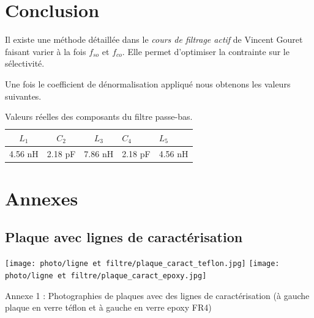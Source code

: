 \documentclass[french]{article}
\begin{document}
\section{Conclusion}
Il existe une méthode détaillée dans le \textit{cours de filtrage actif} de Vincent Gouret faisant varier à la fois $f_{so}$ et $f_{co}$. Elle permet d'optimiser la contrainte sur le sélectivité. 












Une fois le coefficient de dénormalisation appliqué nous obtenons les valeurs suivantes.

\begin{table}[H]
	\centering
	\begin{tabular}{|c|c|c|p{2cm}|p{2cm}|}
		\hline
		$L_1$ & $C_2$ & $L_3$ & $C_4$ & $L_5$\\
		\hline
		4.56 nH & 2.18 pF & 7.86 nH & 2.18 pF & 4.56 nH\\
		\hline
	\end{tabular}
	\caption{Valeurs réelles des composants du filtre passe-bas.}
	\label{tab:valeurs_composant_passe_bas}
\end{table}

\cite{cours_MF} \cite{cours_HF} \cite{data_fr4} \cite{data_PTFE}
{}

\newpage

\section*{Annexes}

\subsection*{Plaque avec lignes de caractérisation}
\texttt{[image: photo/ligne et filtre/plaque\_caract\_teflon.jpg]}
\texttt{[image: photo/ligne et filtre/plaque\_caract\_epoxy.jpg]}
\begin{center}
	Annexe 1 : Photographies de plaques avec des lignes de caractérisation (à gauche plaque en verre téflon et à gauche en verre epoxy FR4)
\end{center}
\end{document}
